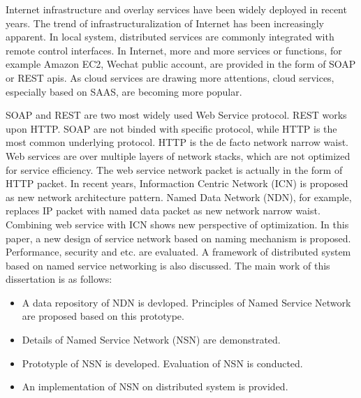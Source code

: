\begin{eabstract} 
   Internet infrastructure and overlay services have been widely deployed in recent years. The trend of infrastructuralization of Internet has been increasingly apparent. In local system, distributed services are commonly integrated with remote control interfaces. In Internet, more and more services or functions, for example Amazon EC2, Wechat public account, are provided in the form of SOAP or REST apis. As cloud services are drawing more attentions, cloud services, especially based on SAAS, are becoming more popular.

   SOAP and REST are two most widely used Web Service protocol. REST works upon HTTP. SOAP are not binded with specific protocol, while HTTP is the most common underlying protocol. HTTP is the de facto network narrow waist. Web services are over multiple layers of network stacks, which are not optimized for service efficiency. The web service network packet is actually in the form of HTTP packet. In recent years, Informaction Centric Network (ICN) is proposed as new network architecture pattern. Named Data Network (NDN), for example, replaces IP packet with named data packet as new network narrow waist. Combining web service with ICN shows new perspective of optimization. In this paper, a new design of service network based on naming mechanism is proposed. Performance, security and etc. are evaluated. A framework of distributed system based on named service networking is also discussed. The main work of this dissertation is as follows:

   \begin{itemize}
    \item A data repository of NDN is devloped. Principles of Named Service Network are proposed based on this prototype.
    \item Details of Named Service Network (NSN) are demonstrated.
    \item Prototyple of NSN is developed. Evaluation of NSN is conducted.
    \item An implementation of NSN on distributed system is provided.
  \end{itemize}
   
\end{eabstract}

